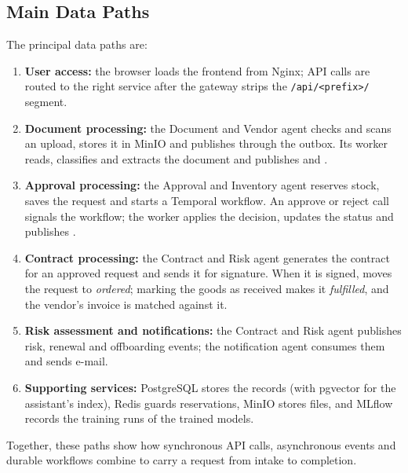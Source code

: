 \subsection{Main Data Paths}
The principal data paths are:
\begin{enumerate}
  \item \textbf{User access:} the browser loads the frontend from Nginx; API calls are routed to the right service after the gateway strips the \texttt{/api/<prefix>/} segment.
  \item \textbf{Document processing:} the Document and Vendor agent checks and scans an upload, stores it in MinIO and publishes  through the outbox. Its worker reads, classifies and extracts the document and publishes  and .
  \item \textbf{Approval processing:} the Approval and Inventory agent reserves stock, saves the request and starts a Temporal workflow. An approve or reject call signals the workflow; the worker applies the decision, updates the status and publishes .
  \item \textbf{Contract processing:} the Contract and Risk agent generates the contract for an approved request and sends it for signature. When it is signed,  moves the request to \emph{ordered}; marking the goods as received makes it \emph{fulfilled}, and the vendor's invoice is matched against it.
  \item \textbf{Risk assessment and notifications:} the Contract and Risk agent publishes risk, renewal and offboarding events; the notification agent consumes them and sends e-mail.
  \item \textbf{Supporting services:} PostgreSQL stores the records (with pgvector for the assistant's index), Redis guards reservations, MinIO stores files, and MLflow records the training runs of the trained models.
\end{enumerate}
Together, these paths show how synchronous API calls, asynchronous events and durable workflows combine to carry a request from intake to completion.
